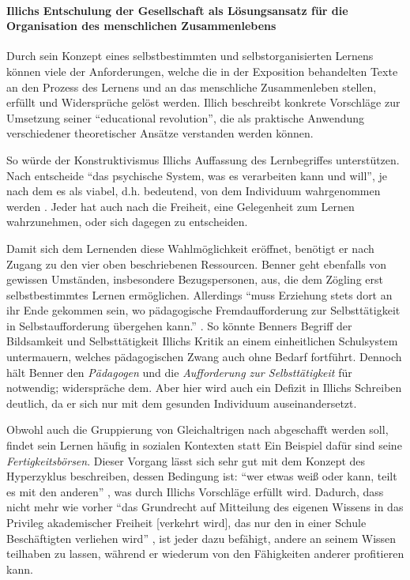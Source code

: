 {\paragraph{Illichs Entschulung der Gesellschaft als Lösungsansatz für die Organisation des menschlichen Zusammenlebens}

Durch sein Konzept eines selbstbestimmten und selbstorganisierten Lernens können viele der Anforderungen, welche die in der Exposition behandelten Texte an den Prozess des Lernens und an das menschliche Zusammenleben stellen, erfüllt und Widersprüche gelöst werden.
Illich beschreibt konkrete Vorschläge zur Umsetzung seiner ``educational revolution'', die als praktische Anwendung verschiedener theoretischer Ansätze verstanden werden können.

So würde der Konstruktivismus Illichs Auffassung des Lernbegriffes unterstützen.
Nach \citeauthor{siebert-2003} entscheide ``das psychische System, was es verarbeiten kann und will'', je nach dem es als viabel, d.h. bedeutend, von dem Individuum wahrgenommen werden \parencite[13]{siebert-2003}.
Jeder hat auch nach \citeauthor{Illich-1971} die Freiheit, eine Gelegenheit zum Lernen wahrzunehmen, oder sich dagegen zu entscheiden.

Damit sich dem Lernenden diese Wahlmöglichkeit eröffnet, benötigt er nach \citeauthor{Illich-1971} Zugang zu den vier oben beschriebenen Ressourcen.
Benner geht ebenfalls von gewissen Umständen, insbesondere Bezugspersonen, aus, die dem Zögling erst selbstbestimmtes Lernen ermöglichen.
Allerdings ``muss Erziehung stets dort an ihr Ende gekommen sein, wo pädagogische Fremdaufforderung zur Selbsttätigkeit in Selbstaufforderung übergehen kann.'' \parencite[91]{benner-2012}.
So könnte Benners Begriff der Bildsamkeit und Selbsttätigkeit Illichs Kritik an einem einheitlichen Schulsystem untermauern, welches pädagogischen Zwang auch ohne Bedarf fortführt.
Dennoch hält Benner den \emph{Pädagogen} und die \emph{Aufforderung zur Selbsttätigkeit} für notwendig; \citeauthor{Illich-1971} widerspräche dem.
Aber hier wird auch ein Defizit in Illichs Schreiben deutlich, da er sich nur mit dem gesunden Individuum auseinandersetzt.

Obwohl auch die Gruppierung von Gleichaltrigen nach \citeauthor{Illich-1971} abgeschafft werden soll, findet sein Lernen häufig in sozialen Kontexten statt
Ein Beispiel dafür sind seine \emph{Fertigkeitsbörsen}.
Dieser Vorgang lässt sich sehr gut mit dem Konzept des Hyperzyklus beschreiben, dessen Bedingung ist: ``wer etwas weiß oder kann, teilt es mit den anderen'' \parencite[123]{Zimpel2012}, was durch Illichs Vorschläge erfüllt wird.
Dadurch, dass nicht mehr wie vorher ``das Grundrecht auf Mitteilung des eigenen Wissens in das Privileg akademischer Freiheit [verkehrt wird], das nur den in einer Schule Beschäftigten verliehen wird'' \parencite[97]{Illich-1971}, ist jeder dazu befähigt, andere an seinem Wissen teilhaben zu lassen, während er wiederum von den Fähigkeiten anderer profitieren kann.

}
